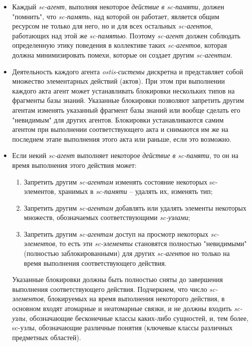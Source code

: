 \begin{itemize}
\item Каждый \textit{sc-агент}, выполняя некоторое \textit{действие в sc-памяти}, должен "помнить"{}, что \textit{sc-память}, над которой он работает, является общим ресурсом не только для него, но и для всех остальных \textit{\mbox{sc-агентов}}, работающих над этой же \textit{sc-памятью}. Поэтому \textit{sc-агент} должен соблюдать определенную этику поведения в коллективе таких \textit{sc-агентов}, которая должна минимизировать помехи, которые он создает другим \textit{sc-агентам}.

\item Деятельность каждого агента \textit{ostis-системы} дискретна и представляет собой множество элементарных действий (актов). При этом при выполнении каждого акта агент может устанавливать блокировки нескольких типов на фрагменты базы знаний. Указанные блокировки позволяют запретить другим агентам изменять указанный фрагмент базы знаний или вообще сделать его "невидимым"{} для других агентов. Блокировки устанавливаются самим агентом при выполнении соответствующего акта и снимаются им же на последнем этапе выполнения этого акта или раньше, если это возможно.
\item Если некий \textit{sc-агент} выполняет некоторое \textit{действие в sc-памяти}, то он на время выполнения этого действия может:
\begin{enumerate}
	\item Запретить другим \textit{sc-агентам} изменять состояние некоторых sc-элементов, хранимых в \textit{sc-памяти} -- удалять их, изменять тип;
	\item Запретить другим \textit{sc-агентам} добавлять или удалять элементы некоторых множеств, обозначаемых соответствующими \textit{sc-узлами};
	\item Запретить другим \textit{sc-агентам} доступ на просмотр некоторых \textit{sc-элементов}, то есть эти \textit{\mbox{sc-элементы}} становятся полностью "невидимыми"{} (полностью заблокированными) для других \textit{sc-агентов} но только на время выполнения соответствующего действия.
\end{enumerate}

Указанные блокировки должны быть полностью сняты до завершения выполнения соответствующего действия. Подчеркнем, что число \textit{sc-элементов}, блокируемых на время выполнения некоторого действия, в основном входят атомарные и неатомарные связки, и не должны входить \textit{sc-узлы}, обозначающие бесконечные классы каких-либо сущностей, и, тем более, sc-узлы, обозначающие различные понятия (ключевые классы различных предметных областей).


\end{itemize}
